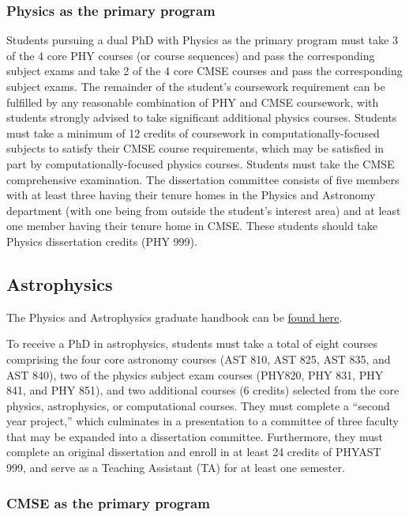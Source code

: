 \subsubsection{Physics as the primary program}

Students pursuing a dual PhD with Physics as the primary program must
take 3 of the 4 core PHY courses (or course sequences) and pass the
corresponding subject exams and take 2 of the 4 core CMSE courses and
pass the corresponding subject exams.  The remainder of the student's
coursework requirement can be fulfilled by any reasonable combination
of PHY and CMSE coursework, with students strongly advised to take
significant additional physics courses.  Students must take a minimum
of 12 credits of coursework in computationally-focused subjects to
satisfy their CMSE course requirements, which may be satisfied in part
by
computationally-focused physics courses.  Students must take the CMSE
comprehensive examination.  The dissertation committee consists of
five members with at least three having their tenure homes in the
Physics and Astronomy department (with one being from outside the
student's interest area) and at least one member having their tenure
home in CMSE.  These students should take Physics dissertation credits
(PHY 999).

\subsection{Astrophysics}

The Physics and Astrophysics graduate handbook can be 
\href{http://www.pa.msu.edu/grad/GradHandbook.pdf}{found
  here}.  

To receive a PhD in astrophysics, students must take a total of eight
courses comprising the four core astronomy courses (AST 810, AST 825,
AST 835, and AST 840), two of the physics subject exam courses
(PHY820, PHY 831, PHY 841, and PHY 851), and two additional courses (6
credits) selected from the core physics, astrophysics, or
computational courses.  They must complete a ``second year project,''
which culminates in a presentation to a committee of three faculty
that may be expanded into a dissertation committee.  Furthermore, they
must 
complete an original
dissertation and enroll in at least 24 credits of PHYAST 999, and
serve as a Teaching Assistant (TA) for at least one semester.

\subsubsection{CMSE as the primary program}

